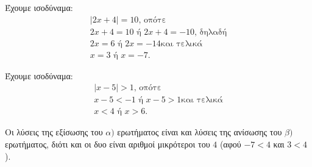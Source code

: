
\begin{alist}
\item Έχουμε ισοδύναμα:
\begin{gather*}
|2x + 4| = 10\text{, οπότε} \\
2x + 4 = 10 \text{ ή } 2x + 4 = -10\text{, δηλαδή} \\
2x = 6 \text{ ή } 2x = -14\text{και τελικά} \\
x = 3 \text{ ή } x = -7.
\end{gather*}

\item Έχουμε ισοδύναμα:
\begin{gather*}
|x - 5| > 1\text{, οπότε} \\
x - 5 < -1 \text{ ή } x - 5 > 1\text{και τελικά} \\
x < 4 \text{ ή } x > 6.
\end{gather*}

\item Οι λύσεις της εξίσωσης του $\alpha)$ ερωτήματος είναι και λύσεις της ανίσωσης του $\beta)$ ερωτήματος, διότι και οι δυο είναι αριθμοί μικρότεροι του $4$ (αφού $-7 < 4$ και $3 < 4$).
\end{alist}

